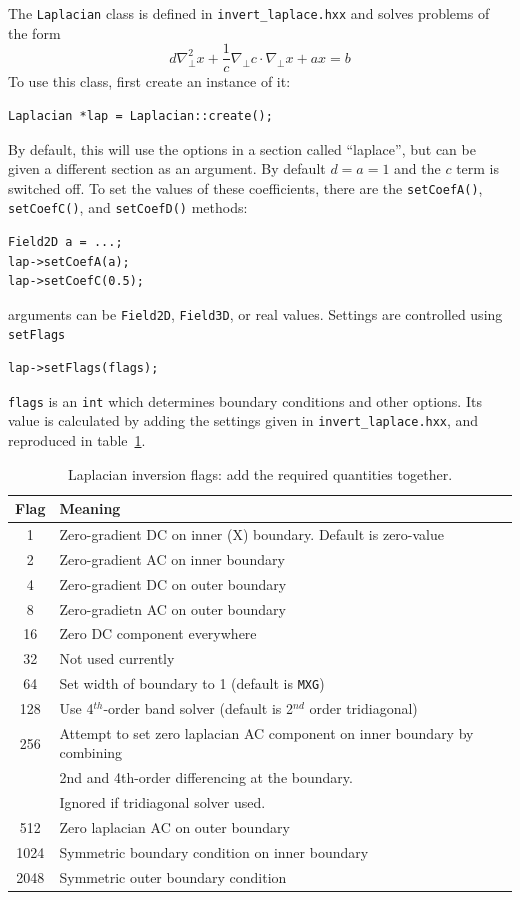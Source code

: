 \documentclass[12pt]{article}
\newcommand{\code}[1]{\texttt{#1}}
\begin{document}
The \lstinline!Laplacian! class is defined in \texttt{invert\_laplace.hxx} and solves
problems of the form
\[
d\nabla_\perp^2 x + \frac{1}{c}\nabla_\perp c \cdot\nabla_\perp x + a x = b
\]
To use this class, first create an instance of it:
\begin{lstlisting}
Laplacian *lap = Laplacian::create();
\end{lstlisting}
By default, this will use the options in a section called ``laplace'', but can be given
a different section as an argument.
By default $d = a = 1$ and the $c$ term is switched off. To set the values of these
coefficients, there are the \lstinline!setCoefA()!, \lstinline!setCoefC()!, and \lstinline!setCoefD()!
methods:
\begin{lstlisting}
Field2D a = ...;
lap->setCoefA(a);
lap->setCoefC(0.5);
\end{lstlisting}
arguments can be \lstinline!Field2D!, \lstinline!Field3D!, or real values. 
Settings are controlled using \lstinline!setFlags! 
\begin{lstlisting}
lap->setFlags(flags);
\end{lstlisting}
\code{flags} is an \code{int} which determines boundary conditions
and other options. Its value is calculated by adding the settings given
in \code{invert\_laplace.hxx}, and reproduced in
table~\ref{tab:laplaceflags}.
\begin{table}[htbp!]
\caption{Laplacian inversion flags: add the required quantities together.}
\label{tab:laplaceflags}
\centering
\begin{tabular}[c]{c | l}
\hline
Flag & Meaning \\
\hline
1 & Zero-gradient DC on inner (X) boundary. Default is zero-value \\
2 & Zero-gradient AC on inner boundary \\
4 & Zero-gradient DC on outer boundary \\
8 & Zero-gradietn AC on outer boundary \\
16 & Zero DC component everywhere \\
32 & Not used currently \\
64 & Set width of boundary to 1 (default is \code{MXG}) \\
128 & Use 4$^{th}$-order band solver (default is 2$^{nd}$ order tridiagonal) \\
256 & Attempt to set zero laplacian AC component on inner boundary by combining \\
    & 2nd and 4th-order differencing at the boundary. \\
    & Ignored if tridiagonal solver used. \\
512 & Zero laplacian AC on outer boundary \\
1024 & Symmetric boundary condition on inner boundary \\
2048 & Symmetric outer boundary condition \\
\hline
\end{tabular}
\end{table}
\end{document}
